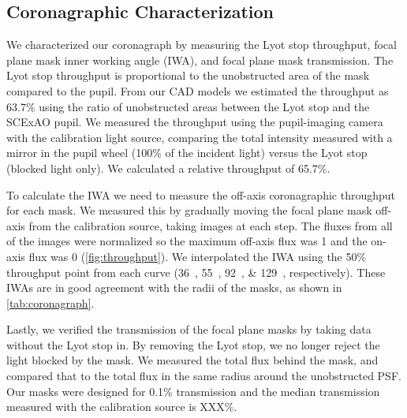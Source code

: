 \documentclass[]{spie}  %
\begin{document}
\subsection{Coronagraphic Characterization}

We characterized our coronagraph by measuring the Lyot stop throughput, focal plane mask inner working angle (IWA), and focal plane mask transmission. The Lyot stop throughput is proportional to the unobstructed area of the mask compared to the pupil. From our CAD models we estimated the throughput as 63.7\% using the ratio of unobstructed areas between the Lyot stop and the SCExAO pupil. We measured the throughput using the pupil-imaging camera with the calibration light source, comparing the total intensity measured with a mirror in the pupil wheel (100\% of the incident light) versus the Lyot stop (blocked light only). We calculated a relative throughput of 65.7\%.

To calculate the IWA we need to measure the off-axis coronagraphic throughput for each mask. We measured this by gradually moving the focal plane mask off-axis from the calibration source, taking images at each step. The fluxes from all of the images were normalized so the maximum off-axis flux was 1 and the on-axis flux was 0 (\autoref{fig:throughput}). We interpolated the IWA using the 50\% throughput point from each curve (\qtylist{36;55;92;129}{\milliarcsecond}, respectively). These IWAs are in good agreement with the radii of the masks, as shown in \autoref{tab:coronagraph}.

Lastly, we verified the transmission of the focal plane masks by taking data without the Lyot stop in. By removing the Lyot stop, we no longer reject the light blocked by the mask. We measured the total flux behind the mask, and compared that to the total flux in the same radius around the unobstructed PSF. Our masks were designed for 0.1\% transmission and the median transmission measured with the calibration source is XXX\%.
\end{document}
